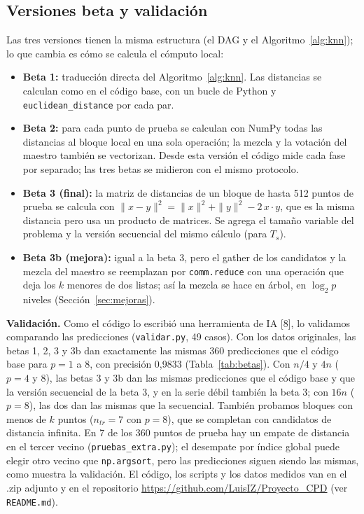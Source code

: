 \documentclass[11pt,a4paper]{article}
\newcommand{\ntr}{n_{tr}}
\begin{document}
\subsection{Versiones beta y validación}
\label{sec:validacion}

Las tres versiones tienen la misma estructura (el DAG y el Algoritmo~\ref{alg:knn}); lo que cambia es cómo se calcula el cómputo local:
\begin{itemize}[nosep]
  \item \textbf{Beta 1:} traducción directa del Algoritmo~\ref{alg:knn}. Las distancias se calculan como en el código base, con un bucle de Python y \texttt{euclidean\_distance} por cada par.
  \item \textbf{Beta 2:} para cada punto de prueba se calculan con NumPy todas las distancias al bloque local en una sola operación; la mezcla y la votación del maestro también se vectorizan. Desde esta versión el código mide cada fase por separado; las tres betas se midieron con el mismo protocolo.
  \item \textbf{Beta 3 (final):} la matriz de distancias de un bloque de hasta 512 puntos de prueba se calcula con $\|x-y\|^2 = \|x\|^2 + \|y\|^2 - 2\,x\cdot y$, que es la misma distancia pero usa un producto de matrices. Se agrega el tamaño variable del problema y la versión secuencial del mismo cálculo (para $T_s$).
  \item \textbf{Beta 3b (mejora):} igual a la beta 3, pero el gather de los candidatos y la mezcla del maestro se reemplazan por \texttt{comm.reduce} con una operación que deja los $k$ menores de dos listas; así la mezcla se hace en árbol, en $\log_2 p$ niveles (Sección~\ref{sec:mejoras}).
\end{itemize}

\textbf{Validación.} Como el código lo escribió una herramienta de IA [8], lo validamos comparando las predicciones (\texttt{validar.py}, 49 casos). Con los datos originales, las betas 1, 2, 3 y 3b dan exactamente las mismas 360 predicciones que el código base para $p = 1$ a $8$, con precisión 0,9833 (Tabla~\ref{tab:betas}). Con $n/4$ y $4n$ ($p = 4$ y $8$), las betas 3 y 3b dan las mismas predicciones que el código base y que la versión secuencial de la beta 3, y en la serie débil también la beta 3; con $16n$ ($p = 8$), las dos dan las mismas que la secuencial. También probamos bloques con menos de $k$ puntos ($\ntr = 7$ con $p = 8$), que se completan con candidatos de distancia infinita. En 7 de los 360 puntos de prueba hay un empate de distancia en el tercer vecino (\texttt{pruebas\_extra.py}); el desempate por índice global puede elegir otro vecino que \texttt{np.argsort}, pero las predicciones siguen siendo las mismas, como muestra la validación. El código, los scripts y los datos medidos van en el .zip adjunto y en el repositorio \url{https://github.com/LuisIZ/Proyecto_CPD} (ver \texttt{README.md}).
\end{document}
